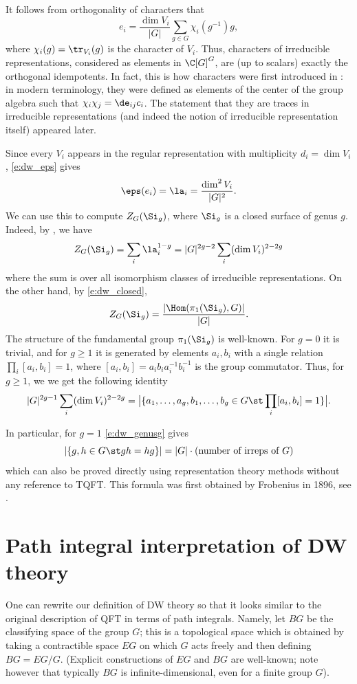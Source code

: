 \begin{remark}\label{r:characters}
  It follows from orthogonality of characters that
  $$
    e_i =\frac{\dim V_i}{|G|} \sum_{g\in G}\chi_i(g^{-1})g,
  $$
  where $\chi_i(g)=\tr_{V_i}(g)$ is the character of $V_i$. Thus, characters of
  irreducible representations, considered as elements in $\C[G]^G$, are (up to
  scalars) exactly the orthogonal idempotents. In fact, this is how characters
  were first introduced in : in modern terminology,
  they were defined as elements of the center of the group algebra such that
  $\chi_i\chi_j = \de_{ij}c_i$. The statement that they are traces in
  irreducible representations (and indeed the notion of irreducible
  representation itself) appeared later.
\end{remark}

Since every $V_i$ appears in the regular representation with
multiplicity $d_i=\dim V_i$, \eqref{e:dw_eps} gives
$$
  \eps(e_i) = \la_i  = \frac{\dim^2 V_i}{|G|^2}.
$$
We can use this to compute $Z_G(\Si_g)$, where $\Si_g$ is a closed
surface of genus $g$. Indeed, by , we have
$$
  Z_G(\Si_g)= \sum_i \la_i^{1-g} = |G|^{2g-2} \sum_i (\dim V_i)^{2-2g}
$$
where the sum is over all isomorphism classes of irreducible representations.
On the other hand, by \eqref{e:dw_closed},
$$
  Z_G(\Si_g) =\frac{|\Hom(\pi_1(\Si_g), G)|}{|G|}.
$$
The structure of the fundamental group $\pi_1(\Si_g)$ is well-known. For $g=0$
it is trivial, and for $g\ge 1$ it is generated by elements $a_i, b_i$ with a
single relation $\prod_i [a_i,b_i]=1$, where $[a_i,b_i] =
a_ib_ia_i^{-1}b_i^{-1}$ is the group commutator. Thus, for $g\ge 1$,
we  we get the following identity
\begin{equation}\label{e:dw_genusg}
  |G|^{2g-1} \sum_i (\dim V_i)^{2-2g}
  =\bigl|
    \{a_1, \dots, a_g, b_1, \dots, b_g\in G\st \prod_i [a_i,b_i]=1\}
    \bigr|.
\end{equation}

In particular, for $g=1$ \eqref{e:dw_genusg} gives
$$
  |\{g,h\in G\st gh=hg\}|=|G|\cdot (\text{number of irreps of $G$})
$$
which can also be proved directly using representation theory methods without
any reference to TQFT. This formula was first obtained by Frobenius in 1896,
see .

\section{Path integral interpretation of DW theory}\label{s:DW-path-integral}
One can rewrite our definition of DW theory so that it looks similar to the
original description of QFT in terms of path integrals. Namely, let $BG$
be the classifying space of the group $G$; this is a topological space which
is obtained by taking a contractible space $EG$ on which $G$ acts freely and
then defining $BG=EG/G$. (Explicit constructions of $EG$ and $BG$ are
well-known; note however that typically $BG$ is infinite-dimensional,
even for a finite group $G$).


